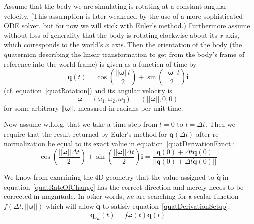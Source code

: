 Assume that the body we are simulating is rotating at a constant angular velocity.
(This assumption is later weakened by the use of a more sophisticated ODE solver,
but for now we will stick with Euler's method.) Furthermore assume without loss of
generality that the body is rotating clockwise about its $x$ axis, which corresponds
to the world's $x$ axis. Then the orientation of the body (the quaternion describing
the linear transformation to get from the body's frame of reference into the world
frame) is given as a function of time by
\begin{equation}
\label{quatDerivationExact}
\mathbf{q}(t) = \cos\left(\frac{||\mathbf{\omega}||t}{2}\right) +
    \sin\left(\frac{||\mathbf{\omega}||t}{2}\right)\mathbf{i}
\end{equation}
(cf. equation~\ref{quatRotation}) and its angular velocity is
\begin{equation}
\mathbf{\omega} = (\omega_1, \omega_2, \omega_3) = (||\mathbf{\omega}||, 0, 0)
\end{equation}
for some arbitrary $||\mathbf{\omega}||$, measured in radians per unit time.

Now assume w.l.o.g. that we take a time step from $t = 0$ to $t = \Delta t$.
Then we require that the result returned by Euler's method for $\mathbf{q}(\Delta t)$
after re-normalization be equal to its exact value in equation~\ref{quatDerivationExact}:
\begin{equation}
\label{quatDerivationSetup}
\cos\left(\frac{||\mathbf{\omega}||\Delta t}{2}\right) +
    \sin\left(\frac{||\mathbf{\omega}||\Delta t}{2}\right)\mathbf{i} =
    \frac{\mathbf{q}(0) + \Delta t \dot{\mathbf{q}}(0)}
        {||\mathbf{q}(0) + \Delta t \dot{\mathbf{q}}(0)||}
\end{equation}

We know from examining the 4D geometry that the value assigned to $\dot{\mathbf{q}}$
in equation~\ref{quatRateOfChange} has the correct direction and merely needs to be
corrected in magnitude. In other words, we are searching for a scalar function
$f(\Delta t, ||\mathbf{\omega}||)$ which will allow $\dot{\mathbf{q}}$ to satisfy
equation~\ref{quatDerivationSetup}:
\begin{equation}
\dot{\mathbf{q}}_{\Delta t}(t) = f\tilde{\mathbf{\omega}}(t)\mathbf{q}(t)
\end{equation}

